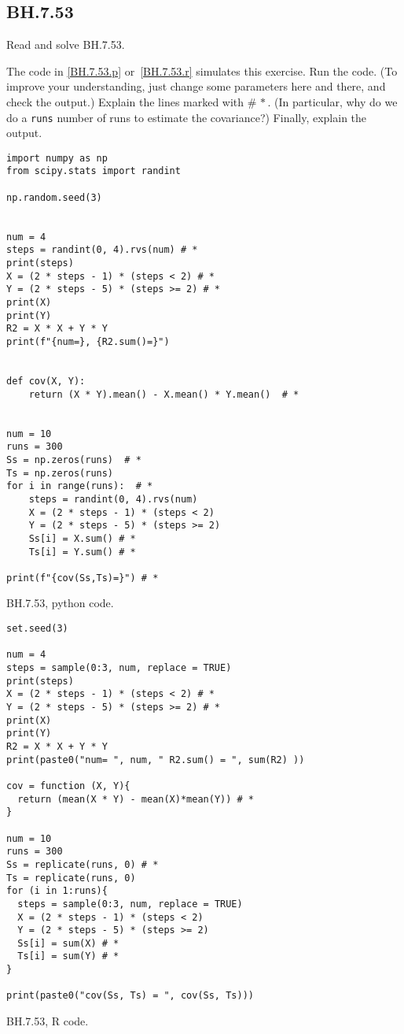 

\subsection{BH.7.53}
\label{sec:bh.53}

\begin{exercise}
Read and solve BH.7.53.
\end{exercise}


\begin{exercise}
The code in \cref{BH.7.53.p} or~\cref{BH.7.53.r} simulates this exercise.
Run the code. (To improve your understanding, just change some parameters here and there, and check the output.) Explain the lines marked with $\# \, *$. (In particular, why do we do a \verb|runs| number of runs to estimate the covariance?) Finally, explain the output.
\end{exercise}

\begin{listing}[!ht]
\begin{verbatim}
import numpy as np
from scipy.stats import randint

np.random.seed(3)


num = 4
steps = randint(0, 4).rvs(num) # *
print(steps)
X = (2 * steps - 1) * (steps < 2) # *
Y = (2 * steps - 5) * (steps >= 2) # *
print(X)
print(Y)
R2 = X * X + Y * Y
print(f"{num=}, {R2.sum()=}")


def cov(X, Y):
    return (X * Y).mean() - X.mean() * Y.mean()  # *


num = 10
runs = 300
Ss = np.zeros(runs)  # *
Ts = np.zeros(runs)
for i in range(runs):  # *
    steps = randint(0, 4).rvs(num)
    X = (2 * steps - 1) * (steps < 2)
    Y = (2 * steps - 5) * (steps >= 2)
    Ss[i] = X.sum() # *
    Ts[i] = Y.sum() # *

print(f"{cov(Ss,Ts)=}") # *
\end{verbatim}
\caption{BH.7.53, python code.}
\label{BH.7.53.p}


\end{listing}

\begin{listing}[!ht]
\begin{verbatim}
set.seed(3)

num = 4
steps = sample(0:3, num, replace = TRUE)
print(steps)
X = (2 * steps - 1) * (steps < 2) # *
Y = (2 * steps - 5) * (steps >= 2) # *
print(X)
print(Y)
R2 = X * X + Y * Y
print(paste0("num= ", num, " R2.sum() = ", sum(R2) ))

cov = function (X, Y){
  return (mean(X * Y) - mean(X)*mean(Y)) # *
}

num = 10
runs = 300
Ss = replicate(runs, 0) # *
Ts = replicate(runs, 0)
for (i in 1:runs){
  steps = sample(0:3, num, replace = TRUE)
  X = (2 * steps - 1) * (steps < 2)
  Y = (2 * steps - 5) * (steps >= 2)
  Ss[i] = sum(X) # *
  Ts[i] = sum(Y) # *
}

print(paste0("cov(Ss, Ts) = ", cov(Ss, Ts)))
\end{verbatim}
\caption{BH.7.53, R code.}
\label{BH.7.53.r}
\end{listing}

